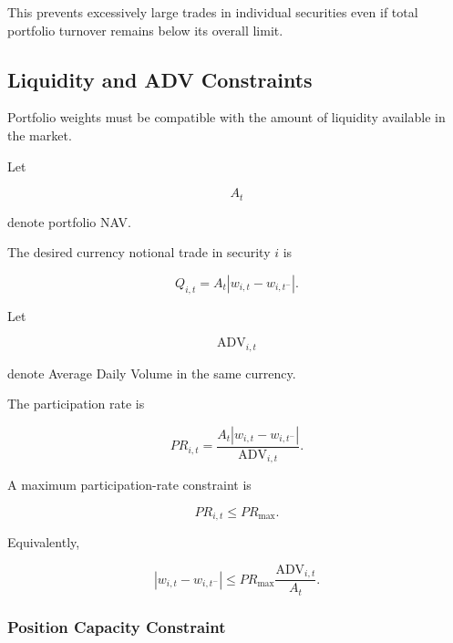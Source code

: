 \documentclass[11pt,a4paper]{article}
\begin{document}
This prevents excessively large trades in individual securities even if total
portfolio turnover remains below its overall limit.


\subsection{Liquidity and ADV Constraints}
\label{subsec:liquidity_adv_constraints}

Portfolio weights must be compatible with the amount of liquidity available in
the market.

Let

\begin{equation}
A_t
\end{equation}

denote portfolio NAV.

The desired currency notional trade in security $i$ is

\begin{equation}
\boxed{
Q_{i,t}
=
A_t
|w_{i,t}-w_{i,t^-}|.
}
\end{equation}

Let

\begin{equation}
\mathrm{ADV}_{i,t}
\end{equation}

denote Average Daily Volume in the same currency.

The participation rate is

\begin{equation}
\boxed{
PR_{i,t}
=
\frac{
A_t
|w_{i,t}-w_{i,t^-}|
}{
\mathrm{ADV}_{i,t}
}.
}
\end{equation}

A maximum participation-rate constraint is

\begin{equation}
\boxed{
PR_{i,t}
\leq
PR_{\max}.
}
\end{equation}

Equivalently,

\begin{equation}
\boxed{
|w_{i,t}-w_{i,t^-}|
\leq
PR_{\max}
\frac{
\mathrm{ADV}_{i,t}
}{
A_t
}.
}
\end{equation}


\subsubsection{Position Capacity Constraint}
\end{document}
